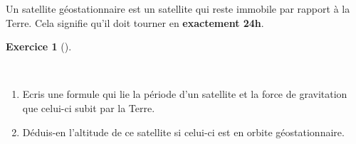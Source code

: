 \documentclass[
  letterpaper,
  DIV=11,
  numbers=noendperiod]{scrartcl}
\providecommand{\tightlist}{%
  \setlength{\itemsep}{0pt}\setlength{\parskip}{0pt}}\usepackage{longtable,booktabs,array}
\theoremstyle{definition}
\newtheorem{exercise}{Exercice}[section]
\theoremstyle{definition}
\theoremstyle{definition}
\theoremstyle{remark}
\begin{document}
Un satellite géostationnaire est un satellite qui reste immobile par
rapport à la Terre. Cela signifie qu'il doit tourner en
\textbf{exactement 24h}.

\begin{exercise}[]\protect\hypertarget{exr-periode-geo}{}\label{exr-periode-geo}

~

\begin{enumerate}
\def\labelenumi{\arabic{enumi}.}
\tightlist
\item
  Ecris une formule qui lie la période d'un satellite et la force de
  gravitation que celui-ci subit par la Terre.
\item
  Déduis-en l'altitude de ce satellite si celui-ci est en orbite
  géostationnaire.
\end{enumerate}

\end{exercise}
\end{document}
